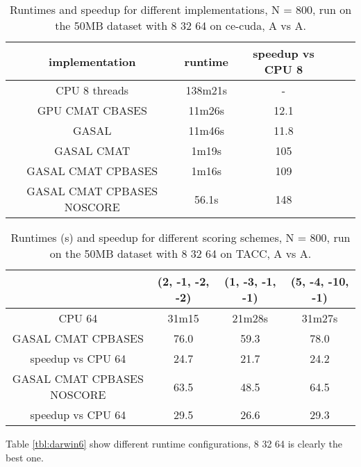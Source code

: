 \documentclass[../thesis.tex]{subfiles}
\begin{document}
\begin{table}
\centering
\caption{Runtimes and speedup for different implementations, N = 800, run on the 50MB dataset with 8 32 64 on ce-cuda, A vs A.}
\label{tbl:darwin3}
\begin{tabular}{c c c c c}
implementation & runtime & speedup vs CPU 8 \\ \hline
CPU 8 threads & 138m21s & - \\
GPU CMAT CBASES & 11m26s & 12.1 \\
GASAL & 11m46s & 11.8 \\
GASAL CMAT & 1m19s & 105 \\
GASAL CMAT CPBASES & 1m16s & 109 \\
GASAL CMAT CPBASES NOSCORE & 56.1s & 148 \\
\end{tabular}
\end{table}


\begin{table}
\centering
\caption{Runtimes (s) and speedup for different scoring schemes, N = 800, run on the 50MB dataset with 8 32 64 on TACC, A vs A.}
\label{tbl:darwin8}
\begin{tabular}{c||c|c|c}
& (2, -1, -2, -2) & (1, -3, -1, -1) & (5, -4, -10, -1) \\ \hline
CPU 64 & 31m15 & 21m28s & 31m27s \\ \hline
GASAL CMAT CPBASES & 76.0 & 59.3 & 78.0 \\
speedup vs CPU 64 & 24.7 & 21.7 & 24.2 \\ \hline
GASAL CMAT CPBASES NOSCORE & 63.5 & 48.5 & 64.5 \\
speedup vs CPU 64 & 29.5 & 26.6 & 29.3 \\
\end{tabular}
\end{table}




Table \ref{tbl:darwin6} show different runtime configurations, 8 32 64 is clearly the best one.
\end{document}
